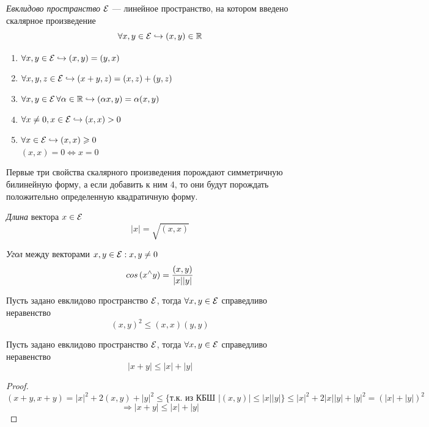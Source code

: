 \begin{definition}
    \textit{Евклидово пространство $\cal E$} --- линейное пространство, на котором введено скалярное произведение
    \[
    \forall x, y \in {\cal E} \hookrightarrow (x, y) \in \mathbb{R}
    \]
    \begin{enumerate}
        \item $\forall x, y \in {\cal E} \hookrightarrow (x, y) = (y, x)$
        \item $\forall x, y, z \in {\cal E} \hookrightarrow (x + y, z) = (x, z) + (y, z)$
        \item $\forall x, y \in {\cal E} \thinspace\forall \alpha \in \mathbb{R} \hookrightarrow (\alpha x, y) = \alpha(x, y)$
        \item  $\forall x \neq 0, x \in {\cal E} \hookrightarrow (x, x) > 0$
        \item[$4^*$] $\forall x \in {\cal E} \hookrightarrow (x, x) \geq 0$\\
        $(x,x) = 0 \Longleftrightarrow x = 0$
    \end{enumerate}
\end{definition}

Первые три свойства скалярного произведения порождают симметричную билинейную форму, а если добавить к ним 4, то они будут порождать положительно определенную квадратичную форму.

\begin{definition}
    \textit{Длина} вектора $x\in \cal E$
    \[
    |x| = \sqrt{(x, x)}
    \]
\end{definition}

\begin{definition}
    \textit{Угол} между векторами $x, y \in {\cal E} : x, y \neq 0$
    \[
    cos\thinspace(x^\wedge y) = \dfrac{(x, y)}{|x||y|}
    \]
\end{definition}

\begin{theorem}
    Пусть задано евклидово пространство $\cal E$, тогда $\forall x, y \in \cal E$ справедливо неравенство
    \[
    (x, y)^2 \leq (x, x) (y, y)
    \]
\end{theorem}

\begin{theorem}
    Пусть задано евклидово пространство $\cal E$, тогда $\forall x, y \in \cal E$ справедливо неравенство
    \[
    |x + y| \leq |x| + |y|
    \]
\end{theorem}
\begin{proof}
    \[
    (x + y, x+ y) = |x|^2 + 2(x, y) + |y|^2 \leq \{ \text{т.к. из КБШ } |(x, y)| \leq |x||y| \} \leq |x|^2 + 2|x||y| + |y|^2 = (|x| + |y|)^2
    \]
    \[
    \Longrightarrow |x + y| \leq |x| + |y|
    \]
\end{proof}

